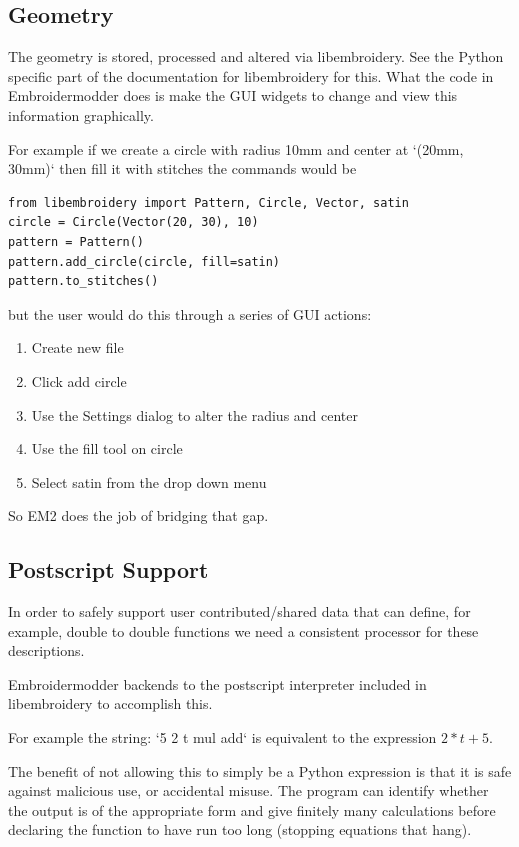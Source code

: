 \subsection{Geometry}

The geometry is stored, processed and altered via libembroidery. See the Python specific part
of the documentation for libembroidery for this. What the code in Embroidermodder does is make
the GUI widgets to change and view this information graphically.

For example if we create a circle with radius 10mm and center at `(20mm, 30mm)` then fill it
with stitches the commands would be

\begin{lstlisting}
from libembroidery import Pattern, Circle, Vector, satin
circle = Circle(Vector(20, 30), 10)
pattern = Pattern()
pattern.add_circle(circle, fill=satin)
pattern.to_stitches()
\end{lstlisting}

but the user would do this through a series of GUI actions:

\begin{enumerate}
\item Create new file
\item Click add circle
\item Use the Settings dialog to alter the radius and center
\item Use the fill tool on circle
\item Select satin from the drop down menu
\end{enumerate}

So EM2 does the job of bridging that gap.

\subsection{Postscript Support}

In order to safely support user contributed/shared data that can define, for example, double to
double functions we need a consistent processor for these descriptions.

Embroidermodder backends to the postscript interpreter included in libembroidery to accomplish
this.

For example the string: `5 2 t mul add` is equivalent to
the expression $2*t + 5$.

The benefit of not allowing this to simply be a Python expression is that it is safe against
malicious use, or accidental misuse. The program can identify whether the output is of the
appropriate form and give finitely many calculations before declaring the function to have run
too long (stopping equations that hang).


